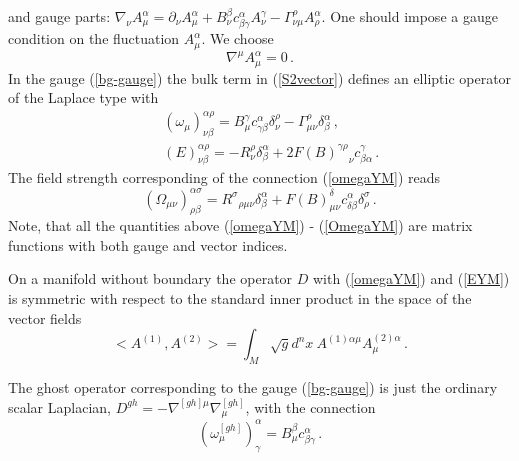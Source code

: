 and gauge parts: $\nabla_\nu A_\mu^\alpha =
\partial_\nu A_\mu^\alpha + B_\nu^\beta c^\alpha_{\beta\gamma}A_\nu^\gamma
-\Gamma_{\nu\mu}^\rho A_\rho^\alpha$. One should impose a gauge
condition on the fluctuation $A_\mu^\alpha$.
We choose
\begin{equation}
\nabla^\mu A_\mu^\alpha = 0 \,.\label{bg-gauge}
\end{equation}
In the gauge (\ref{bg-gauge}) the bulk term in (\ref{S2vector}) defines
an elliptic operator of the Laplace type with
\begin{eqnarray}
&&(\omega_\mu )^{\alpha\rho}_{\nu\beta}=
B_\mu^\gamma c^\alpha_{\gamma\beta} \delta_\nu^\rho
-\Gamma_{\mu\nu}^\rho \delta_\beta^\alpha \,,\label{omegaYM}\\
&&(E)^{\alpha\rho}_{\nu\beta} =-R_\nu^\rho \delta_\beta^\alpha
+2 {F(B)^{\gamma\rho}}_\nu c^\gamma_{\beta\alpha} \,.   \label{EYM}
\end{eqnarray}
The field strength corresponding of the connection (\ref{omegaYM})
reads
\begin{equation}
(\Omega_{\mu\nu})^{\alpha\sigma}_{\rho\beta}=
{R^\sigma}_{\rho\mu\nu}\delta^\alpha_\beta +F(B)^\delta_{\mu\nu}
c^\alpha_{\delta\beta} \delta^\sigma_\rho \,. \label{OmegaYM}
\end{equation}
Note, that all the quantities above (\ref{omegaYM}) - (\ref{OmegaYM})
are matrix functions with both gauge and vector indices.

On a manifold without boundary
the operator $D$ with (\ref{omegaYM}) and (\ref{EYM}) is
symmetric with respect to the standard inner product in the
space of the vector fields
\begin{equation}
<A^{(1)},A^{(2)}>=\int_M \sqrt{g} d^n x\ A^{(1)\alpha\mu}
A^{(2)\alpha}_\mu \,.
\label{inprYM}
\end{equation}

The ghost operator corresponding to the gauge (\ref{bg-gauge})
is just the ordinary scalar Laplacian, $D^{gh}
=-\nabla^{[gh]\mu}\nabla^{[gh]}_\mu$, with the connection
\begin{equation}
(\omega_\mu^{[gh]})^\alpha_\gamma =B_\mu^\beta c^\alpha_{\beta\gamma}\,.
\label{ghostcon}\end{equation}

